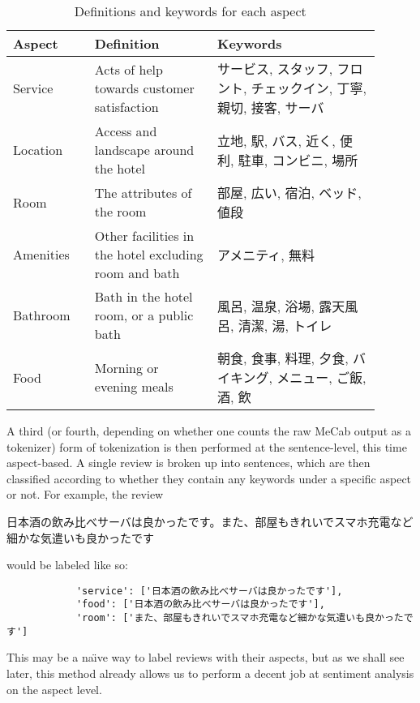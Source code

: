 \documentclass[12pt]{article}
\begin{document}
	\begin{table}
		{\renewcommand{\arraystretch}{1.5}
			\renewcommand{\tabcolsep}{0.2cm}
			\begin{tabular}{|p{0.2\linewidth}|p{0.3\linewidth}|p{0.4\linewidth}|}
				\hline
				Aspect & Definition & Keywords\\
				\hline
				Service & Acts of help towards customer satisfaction & サービス, スタッフ, フロント, チェックイン, 丁寧, 親切, 接客, サーバ\\
				\hline
				Location & Access and landscape around the hotel & 立地, 駅, バス, 近く, 便利, 駐車, コンビニ, 場所\\
				\hline
				Room & The attributes of the room & 部屋, 広い, 宿泊, ベッド, 値段\\
				\hline
				Amenities & Other facilities in the hotel excluding room and bath & アメニティ, 無料\\
				\hline
				Bathroom & Bath in the hotel room, or a public bath & 風呂, 温泉, 浴場, 露天風呂, 清潔, 湯, トイレ\\
				\hline
				Food & Morning or evening meals & 朝食, 食事, 料理, 夕食, バイキング, メニュー, ご飯, 酒, 飲\\
				\hline
		\end{tabular}}
		\caption{Definitions and keywords for each aspect}
	\end{table}
	
	A third (or fourth, depending on whether one counts the raw MeCab output as a tokenizer) form of tokenization is then performed at the sentence-level, this time aspect-based. A single review is broken up into sentences, which are then classified according to whether they contain any keywords under a specific aspect or not. For example, the review \begin{flushleft}
		日本酒の飲み比べサーバは良かったです。また、部屋もきれいでスマホ充電など細かな気遣いも良かったです
	\end{flushleft} would be labeled like so: \begin{center}
		\begin{verbatim}
			'service': ['日本酒の飲み比べサーバは良かったです'],
			'food': ['日本酒の飲み比べサーバは良かったです'],
			'room': ['また、部屋もきれいでスマホ充電など細かな気遣いも良かったです']
		\end{verbatim}
	\end{center}
	
	This may be a na\"\i ve way to label reviews with their aspects, but as we shall see later, this method already allows us to perform a decent job at sentiment analysis on the aspect level.
	
\end{document}
